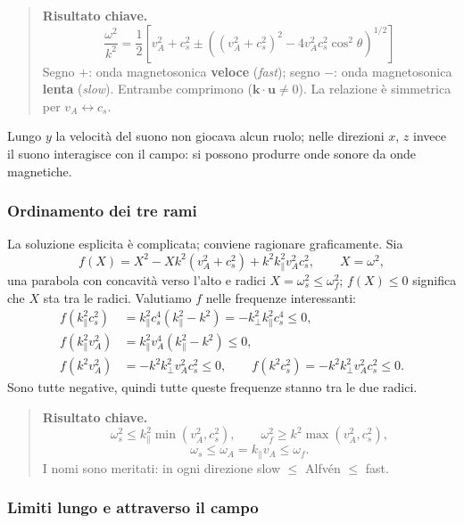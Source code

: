 \begin{quote}
\textbf{Risultato chiave.}
\[
\frac{\omega^2}{k^2}=\frac12\left[v_A^2+c_s^2\pm\left((v_A^2+c_s^2)^2-4v_A^2c_s^2\cos^2\theta\right)^{1/2}\right]
\]
Segno $+$: onda magnetosonica \textbf{veloce} (\emph{fast}); segno $-$: onda magnetosonica \textbf{lenta} (\emph{slow}). Entrambe comprimono ($\mathbf{k}\cdot\mathbf{u}\neq0$). La relazione è simmetrica per $v_A\leftrightarrow c_s$.
\end{quote}

Lungo $y$ la velocità del suono non giocava alcun ruolo; nelle direzioni $x$, $z$ invece il suono interagisce con il campo: si possono produrre onde sonore da onde magnetiche.

\subsubsection{Ordinamento dei tre rami}

La soluzione esplicita è complicata; conviene ragionare graficamente. Sia
\begin{equation}
f(X)=X^2-Xk^2(v_A^2+c_s^2)+k^2k_\parallel^2v_A^2c_s^2,\qquad X=\omega^2,
\end{equation}
una parabola con concavità verso l'alto e radici $X=\omega_s^2\le\omega_f^2$; $f(X)\le0$ significa che $X$ sta tra le radici. Valutiamo $f$ nelle frequenze interessanti:
\begin{align}
f(k_\parallel^2c_s^2)&=k_\parallel^2c_s^4(k_\parallel^2-k^2)=-k_\perp^2k_\parallel^2c_s^4\le0,\\
f(k_\parallel^2v_A^2)&=k_\parallel^2v_A^4(k_\parallel^2-k^2)\le0,\\
f(k^2v_A^2)&=-k^2k_\perp^2v_A^2c_s^2\le0,\qquad f(k^2c_s^2)=-k^2k_\perp^2v_A^2c_s^2\le0 .
\end{align}
Sono tutte negative, quindi tutte queste frequenze stanno tra le due radici.

\begin{quote}
\textbf{Risultato chiave.}
\[
\omega_s^2\le k_\parallel^2\min(v_A^2,c_s^2),\qquad\omega_f^2\ge k^2\max(v_A^2,c_s^2),
\]
\[
\omega_s\le\omega_A=k_\parallel v_A\le\omega_f .
\]
I nomi sono meritati: in ogni direzione slow $\le$ Alfvén $\le$ fast.
\end{quote}

\subsubsection{Limiti lungo e attraverso il campo}

